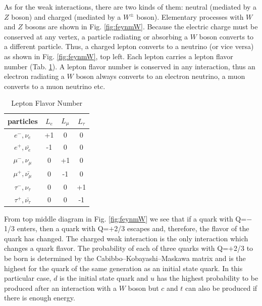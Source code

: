 As for the weak interactions, there are two kinds of them: neutral (mediated by a $Z$ boson) and charged (mediated by a $W^\pm$ boson). Elementary processes with $W$ and $Z$ bosons are shown in Fig. \ref{fig:feynmW}. Because the electric charge must be conserved at any vertex, a particle radiating or absorbing a $W$ boson converts to a different particle. Thus, a charged lepton converts to a neutrino (or vice versa) as shown in Fig. \ref{fig:feynmW}, top left. Each lepton carries a lepton flavor number (Tab. \ref{tab:LeptonFlavorNumber}). A lepton flavor number is conserved in any interaction, thus an electron radiating a $W$ boson  always converts to an electron neutrino, a muon converts to a muon neutrino etc.\\

 \begin{table}[h]
  \begin{center}
  \caption{ Lepton Flavor Number}
  \vspace{5 mm}
  \begin{tabular}{|c|c|c|c|}
     \hline
     particles & $L_e$ & $L_{\mu}$ & $L_{\tau}$ \\ \hline
     $e^-,\nu_e$ &  +1  &  0  &  0  \\ \hline 
     $e^+, \bar{\nu_e}$ &  -1  &  0  &  0  \\ \hline 
     $\mu^-,\nu_{\mu}$ &  0  &  +1  &  0  \\ \hline 
     $\mu^+, \bar{\nu_{\mu}}$ &  0  &  -1  &  0  \\ \hline 
     $\tau^-,\nu_{\tau}$ &  0  &  0  &  +1  \\ \hline 
     $\tau^+, \bar{\nu_{\tau}}$ &  0  &  0  &  -1  \\ \hline 
  \end{tabular}
  \label{tab:LeptonFlavorNumber}
  \end{center}
 \end{table}

From top middle diagram in Fig. \ref{fig:feynmW} we see that if a quark with Q=$-$1/3 enters, then a quark with Q=$+$2/3 escapes and, therefore, the flavor of the quark has changed. The charged weak interaction is the only interaction which changes a quark flavor. The probability of each of three quarks with Q=$+$2/3 to be born is determined by the Cabibbo–Kobayashi–Maskawa matrix and is the highest for the quark of the same generation as an initial state quark. In this particular case, $d$ is the initial state quark and $u$ has the highest probability to be produced after an interaction with a $W$ boson but $c$ and $t$ can also be produced if there is enough energy.\\

